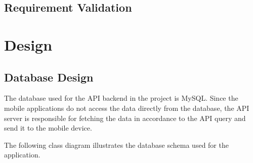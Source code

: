 \documentclass[12pt, a4paper, oneside]{article}
\begin{document}
\subsection{Requirement Validation}

\pagebreak
\section{Design}
\subsection{Database Design}
The database used for the API backend in the project is MySQL. Since the mobile applications do not access the data directly from the database, the API server is responsible for fetching the data in accordance to the API query and send it to the mobile device. 

The following class diagram illustrates the database schema used for the application. 
\end{document}
